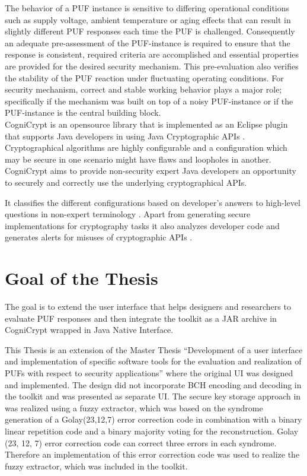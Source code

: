 The behavior of a PUF instance is sensitive to differing operational conditions such as supply voltage, ambient temperature or aging effects that can result in slightly different PUF responses each time the PUF is challenged. Consequently an adequate pre-assessment of the PUF-instance is required to ensure that the response is consistent, required criteria are accomplished and essential properties are provided for the desired security mechanism. This pre-evaluation also verifies the stability of
the PUF reaction under fluctuating operating conditions. For security mechanism, correct and stable working behavior plays a major role; specifically if the mechanism was built on top of a noisy PUF-instance or if the PUF-instance is the central building block.\\

CogniCrypt is an opensource library that is implemented as an Eclipse plugin that supports Java developers in using Java Cryptographic APIs \cite{cogni}. Cryptographical algorithms are highly configurable and a configuration which may be secure in one scenario might have flaws and loopholes in another. CogniCrypt aims to provide non-security expert Java developers an opportunity to securely and correctly use the underlying cryptographical APIs.

It classifies the different configurations based on developer's answers to high-level questions in non-expert terminology \cite{onward2015}. Apart from generating secure implementations for cryptography tasks it also analyzes developer code and generates alerts for misuses of cryptographic APIs \cite{cogni}. 


\section{Goal of the Thesis}
The goal is to extend the user interface that helps designers and researchers to evaluate PUF responses  and then integrate the toolkit as a JAR archive in CogniCrypt wrapped in Java Native Interface.

This Thesis is an extension of the Master Thesis ``Development of a user interface and implementation of specific software tools for the evaluation and realization of PUFs with respect to security applications''\cite{71} where the original UI was designed and implemented. The design did not incorporate BCH encoding and decoding in the toolkit and was presented as separate UI. The secure key storage approach in \cite{10} was realized using a fuzzy extractor, which was based on the syndrome
generation of a Golay(23,12,7) error correction code in combination with a binary linear repetition code and a binary majority voting for the reconstruction\cite{71}. Golay (23, 12, 7) error correction code can correct three errors in each syndrome. Therefore an implementation of this error correction code was used to realize the fuzzy extractor, which was included in the toolkit.


